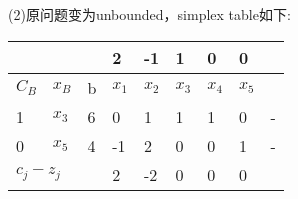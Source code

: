 \documentclass[12pt]{article}
\begin{document}
(2)原问题变为unbounded，simplex table如下:
\begin{table}[h]
    \centering
    \begin{tabular}{l|l|l|lllll|l}
    \multicolumn{3}{l|}{} & 2  & -1 & 1 & 0 & 0 &  \\ \hline
    $C_B$  &  $x_B$ &  b  &  $x_1$  & $x_2$ & $x_3$ & $x_4$ & $x_5$ &  \\ \hline
    1      &  $x_3$    & 6     & 0  & 1  & 1 & 1 & 0 & - \\
    0      &    $x_5$  & 4     & -1 & 2  & 0 & 0 & 1 & - \\ \hline
    \multicolumn{3}{l|}{$c_j-z_j$} & 2  & -2 & 0 & 0 & 0 & 
    \end{tabular}
    \end{table}\\
\end{document}
